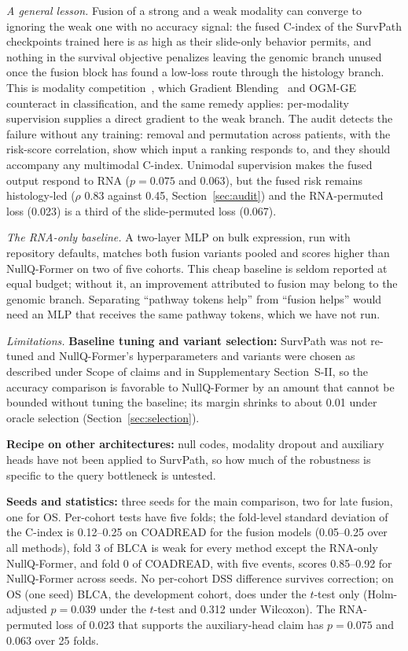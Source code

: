 \documentclass[journal]{IEEEtran}
\newcommand{\pq}{NullQ-Former}
\newcommand{\cindex}{C-index}
\begin{document}
\textit{A general lesson.} Fusion of a strong and a weak modality can converge to ignoring the weak one with no accuracy signal: the fused \cindex{} of the SurvPath checkpoints trained here is as high as their slide-only behavior permits, and nothing in the survival objective penalizes leaving the genomic branch unused once the fusion block has found a low-loss route through the histology branch. This is modality competition~\cite{huang2022competition}, which Gradient Blending~\cite{wang2020gradientblending} and OGM-GE~\cite{peng2022ogmge} counteract in classification, and the same remedy applies: per-modality supervision supplies a direct gradient to the weak branch. The audit detects the failure without any training: removal and permutation across patients, with the risk-score correlation, show which input a ranking responds to, and they should accompany any multimodal \cindex{}. Unimodal supervision makes the fused output respond to RNA ($p = 0.075$ and $0.063$), but the fused risk remains histology-led ($\rho$ 0.83 against 0.45, Section~\ref{sec:audit}) and the RNA-permuted loss (0.023) is a third of the slide-permuted loss (0.067).

\textit{The RNA-only baseline.} A two-layer MLP on bulk expression, run with repository defaults, matches both fusion variants pooled and scores higher than \pq{} on two of five cohorts. This cheap baseline is seldom reported at equal budget; without it, an improvement attributed to fusion may belong to the genomic branch. Separating ``pathway tokens help'' from ``fusion helps'' would need an MLP that receives the same pathway tokens, which we have not run.

\textit{Limitations.} \textbf{Baseline tuning and variant selection:} SurvPath was not re-tuned and \pq{}'s hyperparameters and variants were chosen as described under Scope of claims and in Supplementary Section~S-II, so the accuracy comparison is favorable to \pq{} by an amount that cannot be bounded without tuning the baseline; its margin shrinks to about 0.01 under oracle selection (Section~\ref{sec:selection}).

\textbf{Recipe on other architectures:} null codes, modality dropout and auxiliary heads have not been applied to SurvPath, so how much of the robustness is specific to the query bottleneck is untested.

\textbf{Seeds and statistics:} three seeds for the main comparison, two for late fusion, one for OS. Per-cohort tests have five folds; the fold-level standard deviation of the \cindex{} is 0.12--0.25 on COADREAD for the fusion models (0.05--0.25 over all methods), fold 3 of BLCA is weak for every method except the RNA-only \pq{}, and fold 0 of COADREAD, with five events, scores 0.85--0.92 for \pq{} across seeds. No per-cohort DSS difference survives correction; on OS (one seed) BLCA, the development cohort, does under the $t$-test only (Holm-adjusted $p = 0.039$ under the $t$-test and 0.312 under Wilcoxon). The RNA-permuted loss of 0.023 that supports the auxiliary-head claim has $p = 0.075$ and $0.063$ over 25 folds.
\end{document}
